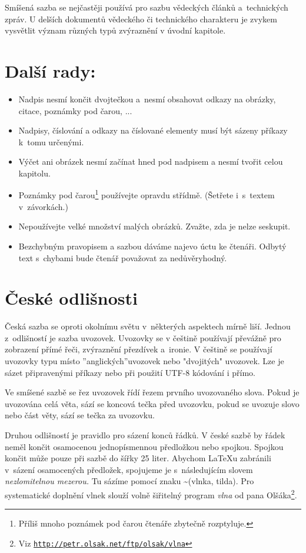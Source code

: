 \documentclass[10pt, a4paper, twocolumn]{article}
\begin{document}
Smíšená sazba se nejčastěji používá pro sazbu vědeckých článků a~technických zpráv. U delších dokumentů vědeckého či technického charakteru je zvykem vysvětlit význam různých typů zvýraznění v úvodní kapitole.

\section{Další rady:}
\label{dalsi_rady}

\begin{itemize}
    \item Nadpis nesmí končit dvojtečkou a~nesmí obsahovat odkazy na obrázky, citace, poznámky pod čarou, ...
    \item Nadpisy, číslování a odkazy na číslované elementy musí být sázeny příkazy k~tomu určenými.
    \item Výčet ani obrázek nesmí začínat hned pod nadpisem a nesmí tvořit celou kapitolu.
    \item Poznámky pod čarou\footnote[1]{Příliš mnoho poznámek pod čarou čtenáře zbytečně rozptyluje.} používejte opravdu střídmě. (Šetřete i~s~textem v~závorkách.)
    \item Nepoužívejte velké množství malých obrázků. Zvažte, zda je nelze seskupit.
    \item Bezchybným pravopisem a sazbou dáváme najevo úctu ke čtenáři. Odbytý text s~chybami bude čtenář považovat za nedůvěryhodný.
\end{itemize}

\section{České odlišnosti}

Česká sazba se oproti okolnímu světu v~některých aspektech mírně liší. Jednou z~odlišností je sazba uvozovek. Uvozovky se v češtině používají převážně pro zobrazení přímé řeči, zvýraznění přezdívek a~ironie. V češtině se používají uvozovky typu  místo ''anglických''uvozovek nebo "dvojitých" uvozovek. Lze je sázet připravenými příkazy nebo při použití UTF-8 kódování i přímo.

Ve smíšené sazbě se řez uvozovek řídí řezem prvního uvozovaného slova. Pokud je uvozována celá věta, sází se koncová tečka před uvozovku, pokud se uvozuje slovo nebo část věty, sází se tečka za uvozovku.

Druhou odlišností je pravidlo pro sázení konců řádků. V české sazbě by řádek neměl končit osamocenou jednopísmennou předložkou nebo spojkou. Spojkou  končit může pouze při sazbě do šířky 25 liter. Abychom LaTeXu zabránili v~sázení osamocených předložek, spojujeme je s~následujícím slovem {\itshape nezlomitelnou mezerou.} Tu sázíme pomocí znaku \textasciitilde (vlnka, tilda). Pro systematické doplnění vlnek slouží volně šiřitelný program {\itshape vlna} od pana Olšáka\footnote[2]{Viz \texttt{\href{http://petr.olsak.net/ftp/olsak/vlna}{http://petr.olsak.net/ftp/olsak/vlna}}}.
\end{document}
